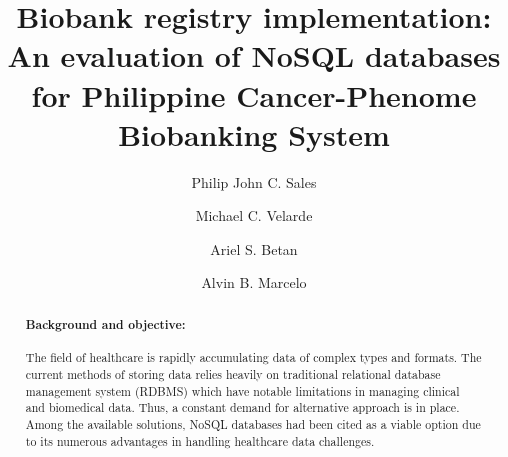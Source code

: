 \documentclass[5p]{elsarticle}
\begin{document}
\begin{frontmatter}

\title{Biobank registry implementation: An evaluation of NoSQL databases \\for Philippine Cancer-Phenome Biobanking System}


\author[miuaddress]{Philip John C. Sales}

\author[regenlabaddress]{Michael C. Velarde}

\author[miuaddress,casaddress]{Ariel S. Betan}


\author[miuaddress]{Alvin B. Marcelo}


\address[miuaddress]{Medical Informatics Unit, College of Medicine, University of the Philippines, Ermita, Metro Manila}
\address[regenlabaddress]{Regenerative Biology Research Laboratory, Institute of Biology, University of the Philippines, Quezon City, Diliman }
\address[casaddress]{College of Arts and Sciences, Department of Social Sciences, University of the Philippines, Ermita, Metro Manila}

\begin{abstract}

\paragraph{Background and objective:} The field of healthcare is rapidly accumulating data of complex types and formats. 
The current methods of storing data relies heavily on traditional relational database management system (RDBMS) which have notable limitations 
in managing clinical and biomedical data. Thus, a constant demand for alternative approach is in place. 
Among the available solutions, NoSQL databases had been cited as a viable option due to its numerous advantages in handling healthcare data challenges. 


\end{abstract}
\end{frontmatter}
\end{document}
